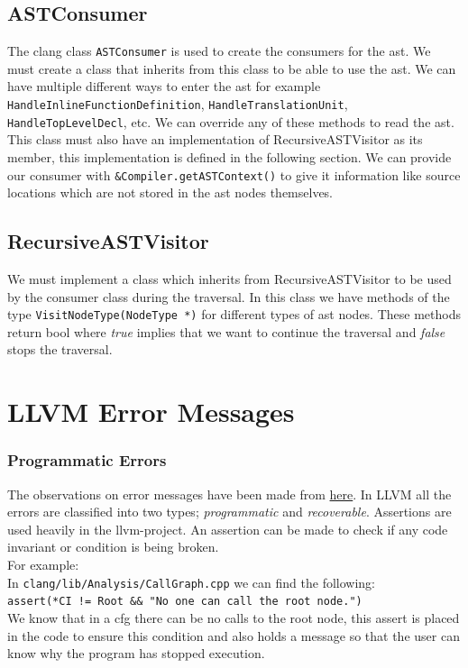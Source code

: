 \documentclass[12pt]{article}
\newcommand{\code}{\texttt}
\begin{document}
\subsection{ASTConsumer}
The clang class \code{ASTConsumer} is used to create the consumers for the ast. We must create a class that inherits from this class to be able to use the ast. We can have multiple different ways to enter the ast for example \code{HandleInlineFunctionDefinition}, \code{HandleTranslationUnit}, \code{HandleTopLevelDecl}, etc. We can override any of these methods to read the ast. This class must also have an implementation of RecursiveASTVisitor as its member, this implementation is defined in the following section. We can provide our consumer with \code{\&Compiler.getASTContext()} to give it information like source locations which are not stored in the ast nodes themselves.
\subsection{RecursiveASTVisitor}
We must implement a class which inherits from RecursiveASTVisitor to be used by the consumer class during the traversal. In this class we have methods of the type \code{VisitNodeType(NodeType *)} for different types of ast nodes. These methods return bool where \textit{true} implies that we want to continue the traversal and \textit{false} stops the traversal.
\newpage
\section{LLVM Error Messages}
\subsubsection{Programmatic Errors}
The observations on error messages have been made from \href{http://llvm.org/docs/ProgrammersManual.html}{here}.
In LLVM all the errors are classified into two types; \textit{programmatic} and \textit{recoverable}. Assertions are used heavily in the llvm-project. An assertion can be made to check if any code invariant or condition is being broken.\\
For example:\\
In \code{clang/lib/Analysis/CallGraph.cpp} we can find the following:\\
\hspace*{5ex} \code{assert(*CI != Root \&\& "No one can call the root node.")}
\\ We know that in a cfg there can be no calls to the root node, this assert is placed in the code to ensure this condition and also holds a message so that the user can know why the program has stopped execution.
\end{document}
